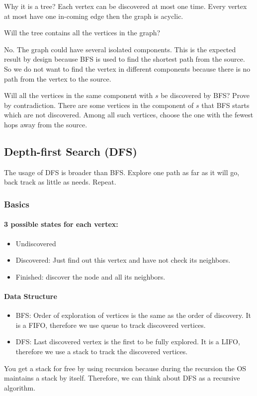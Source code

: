 \documentclass[en,hazy,blue,normal,12pt]{elegantnote}
\begin{document}
Why it is a tree? Each vertex can be discovered at most one time. Every 
vertex at most have one in-coming edge then the graph is acyclic.

Will the tree contains all the vertices in the graph? 

No. The graph could have 
several isolated components. This is the expected result by design because BFS 
is used to find the shortest path from the source. So we do not want to find 
the vertex in different components because there is no path from the vertex to 
the source.

Will all the vertices in the same component with $s$ be discovered by BFS?
Prove by contradiction. There are some vertices in the component of $s$ that 
BFS starts which are not discovered. Among all such vertices, choose the one 
with the fewest hops away from the source.
\subsection{Depth-first Search (DFS)}
The usage of DFS is broader than BFS. Explore one path as far as it will go, 
back track as little as needs. Repeat.

\subsubsection{Basics}

\paragraph{3 possible states for each vertex:}
\begin{itemize}
 \item Undiscovered
 \item Discovered: Just find out this vertex and have not check its neighbors.
 \item Finished: discover the node and all its neighbors.
\end{itemize}
\paragraph{Data Structure}
\begin{itemize}
\item BFS: Order of exploration of vertices is the same as the order of 
discovery. It is a FIFO, therefore we use queue to track discovered vertices.
\item DFS: Last discovered vertex is the first to be fully explored. It is a 
LIFO, therefore we use a stack to track the discovered vertices.
\end{itemize}
You get a stack for free by using recursion because during the recursion the 
OS maintains a stack by itself. Therefore, we can think about DFS as a 
recursive algorithm.
\end{document}
